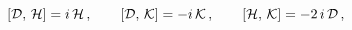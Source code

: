 \begin{equation}\label{boro1.7}
[{\cal D},\,{\cal H} ]=i\,{\cal H}\,,\qquad [{\cal D},\,{\cal K}]=
-i\,{\cal K}\,,\qquad [{\cal H},\,{\cal K}]=-2\,i\,{\cal D}\,,
\end{equation}

